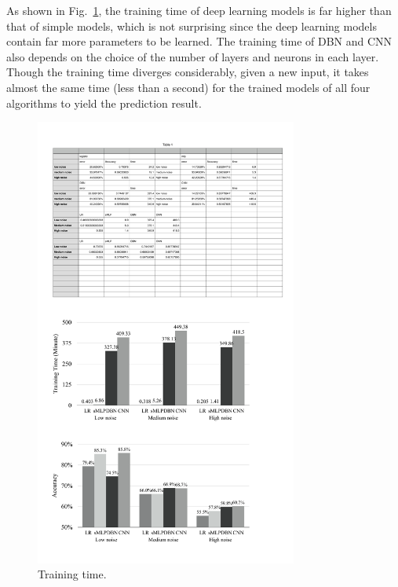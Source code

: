 As shown in Fig.~\ref{fig:time}, the training time of deep learning models is far higher than that of simple models, which is not surprising since the deep learning models contain far more parameters to be learned. The training time of DBN and CNN also depends on the choice of the number of layers and neurons in each layer. Though the training time diverges considerably, given a new input, it takes almost the same time (less than a second) for the trained models of all four algorithms to yield the prediction result. 


\begin{figure}[t]
	\center
	\hspace{-0.4cm}
	\includegraphics[trim = 0mm 0mm 0mm 12mm,clip,width=3.4in]{figs/t}
	\caption{Training time.} \label{fig:time}
\end{figure}  

 

